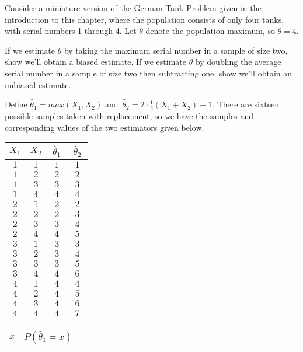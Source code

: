 \begin{examp}\label{MiniGermanTank}Consider a miniature version of the German Tank Problem given in the introduction to this chapter, where the population consists of only four tanks, with serial numbers 1 through 4. Let $\theta$ denote the population maximum, so $\theta = 4$. 
\par
\noindent If we estimate $\theta$ by taking the maximum serial number in a sample of size two, show we'll obtain a biased estimate. If we estimate $\theta$ by doubling the average serial number in a sample of size two then subtracting one, show we'll obtain an unbiased estimate.
\par
\noindent Define $\widehat{\theta}_1 = max(X_1,X_2)$ and \,$\widehat{\theta}_2 = 2 \cdot \frac{1}{2}(X_1 + X_2) - 1$. There are sixteen possible samples taken with replacement, so we have the samples and corresponding values of the two estimators given below.
\begin{center}
\begin{minipage}{0.5\textwidth}
\centering
\begin{tabular}{c|c|c|c}
$X_1$ & $X_2$ & $\,\widehat{\theta}_1\,$ & $\,\widehat{\theta}_2\,$ \\
\hline
$1$ & $1$ & $1$ & $1$ \\
$1$ & $2$ & $2$ & $2$ \\
$1$ & $3$ & $3$ & $3$ \\
$1$ & $4$ & $4$ & $4$ \\
$2$ & $1$ & $2$ & $2$ \\
$2$ & $2$ & $2$ & $3$ \\
$2$ & $3$ & $3$ & $4$ \\
$2$ & $4$ & $4$ & $5$ \\
$3$ & $1$ & $3$ & $3$ \\
$3$ & $2$ & $3$ & $4$ \\
$3$ & $3$ & $3$ & $5$ \\
$3$ & $4$ & $4$ & $6$ \\
$4$ & $1$ & $4$ & $4$ \\
$4$ & $2$ & $4$ & $5$ \\
$4$ & $3$ & $4$ & $6$ \\
$4$ & $4$ & $4$ & $7$ \\
\end{tabular}
\end{minipage}\begin{minipage}{0.5\textwidth}
\centering
\renewcommand*{\arraystretch}{1.23}
\begin{tabular}{c|c}
$x$ & $P(\widehat{\theta}_1 = x)$ \\

\end{tabular}
\end{minipage}
\end{center}
\end{examp}
